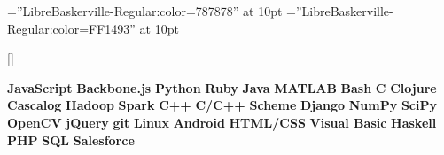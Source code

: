 \font\lighttext=''LibreBaskerville-Regular:color=787878'' at 10pt
\font\lighttextweb=''LibreBaskerville-Regular:color=FF1493'' at 10pt

\titleformat{\section}{\Large\scshape\raggedright\sffamily}{}{0em}{}[\titlerule]

\setlength{\parindent}{0pt}

\newcommand{\skill}{\textbf}
\newcommand{\institution}{\textsc}

\def\div{\,\textbar{}\,}

\usepackage{xspace}


\newcommand{\lang}[2]{\expandafter\def\csname #1\endcsname{\skill{#2}\xspace}}

\lang{js}{JavaScript}
\lang{backbone}{Backbone.js}
\lang{python}{Python}
\lang{ruby}{Ruby}
\lang{java}{Java}
\lang{matlab}{MATLAB}
\lang{bash}{Bash}
\lang{c}{C}
\lang{clojure}{Clojure}
\lang{cascalog}{Cascalog}
\lang{hadoop}{Hadoop}
\lang{spark}{Spark}
\lang{cpp}{C++}
\lang{ccpp}{C/C++}
\lang{scheme}{Scheme}
\lang{django}{Django}
\lang{numpy}{NumPy}
\lang{scipy}{SciPy}
\lang{opencv}{OpenCV}
\lang{jquery}{jQuery}
\lang{git}{git}
\lang{linux}{Linux}
\lang{android}{Android}
\lang{html}{HTML/CSS}
\lang{visb}{Visual Basic}
\lang{haskell}{Haskell}
\lang{php}{PHP}
\lang{sql}{SQL}
\lang{salesforce}{Salesforce}
